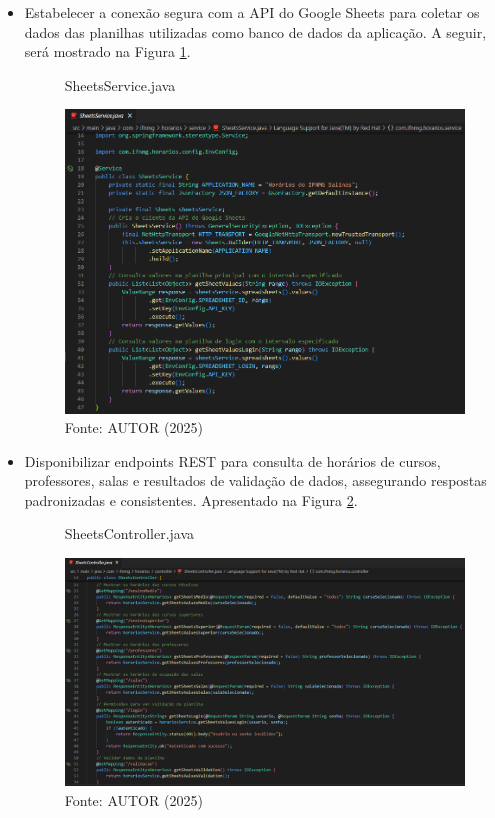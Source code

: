 \begin{itemize}
    \item Estabelecer a conexão segura com a API do Google Sheets para coletar os dados das planilhas utilizadas como banco de dados da aplicação. A seguir, será mostrado na Figura \ref{fig_back_2}.
    
    \begin{figure}[H]
        \centering
        \caption{SheetsService.java}
        \includegraphics[width=1\textwidth]{Figuras/back-2.png}
        \caption*{Fonte: AUTOR (2025)}
        \label{fig_back_2}
    \end{figure}

    \item Disponibilizar endpoints REST para consulta de horários de cursos, professores, salas e resultados de validação de dados, assegurando respostas padronizadas e consistentes. Apresentado na Figura \ref{fig_back_3}.
    
    \begin{figure}[H]
        \centering
        \caption{SheetsController.java}
        \includegraphics[width=1\textwidth]{Figuras/back-3.png}
        \caption*{Fonte: AUTOR (2025)}
        \label{fig_back_3}
    \end{figure}
\end{itemize}

